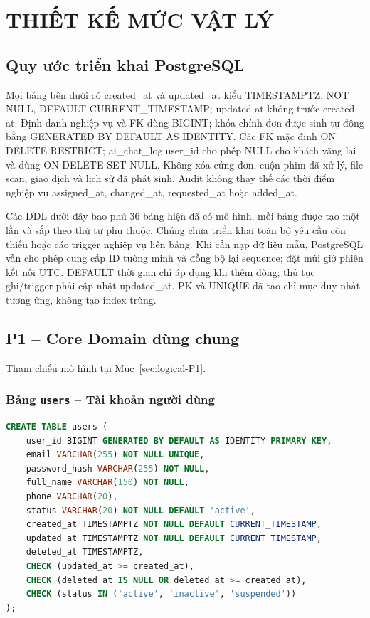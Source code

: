 \chapter{THIẾT KẾ MỨC VẬT LÝ}

\section{Quy ước triển khai PostgreSQL}

Mọi bảng bên dưới có created\_at và updated\_at kiểu TIMESTAMPTZ, NOT NULL,
DEFAULT CURRENT\_TIMESTAMP; updated at không trước created at. Định danh
nghiệp vụ và FK dùng BIGINT; khóa chính đơn được sinh tự động bằng
GENERATED BY DEFAULT AS IDENTITY. Các FK mặc định
ON DELETE RESTRICT; ai\_chat\_log.user\_id cho phép NULL cho khách vãng lai
và dùng ON DELETE SET NULL. Không xóa cứng đơn, cuộn phim đã xử lý, file
scan, giao dịch và lịch sử đã phát sinh. Audit không thay thế các thời
điểm nghiệp vụ assigned\_at, changed\_at, requested\_at hoặc added\_at.

Các DDL dưới đây bao phủ 36 bảng hiện đã có mô hình, mỗi bảng được tạo
một lần và sắp theo thứ tự phụ thuộc. Chúng chưa triển khai toàn bộ yêu
cầu còn thiếu hoặc các trigger nghiệp vụ liên bảng. Khi cần nạp dữ liệu
mẫu, PostgreSQL vẫn cho phép cung cấp ID tường minh và đồng bộ lại sequence;
đặt múi giờ phiên kết nối UTC. DEFAULT thời
gian chỉ áp dụng khi thêm dòng; thủ tục ghi/trigger phải cập nhật updated\_at.
PK và UNIQUE đã tạo chỉ mục duy nhất tương ứng, không tạo index trùng.
\section{P1 -- Core Domain dùng chung}
Tham chiếu mô hình tại Mục~\ref{sec:logical-P1}.
\subsection{Bảng \texttt{users} -- Tài khoản người dùng}
\label{physical-users}
\begin{lstlisting}[language=SQL,breaklines=true,basicstyle=\ttfamily\scriptsize]
CREATE TABLE users (
    user_id BIGINT GENERATED BY DEFAULT AS IDENTITY PRIMARY KEY,
    email VARCHAR(255) NOT NULL UNIQUE,
    password_hash VARCHAR(255) NOT NULL,
    full_name VARCHAR(150) NOT NULL,
    phone VARCHAR(20),
    status VARCHAR(20) NOT NULL DEFAULT 'active',
    created_at TIMESTAMPTZ NOT NULL DEFAULT CURRENT_TIMESTAMP,
    updated_at TIMESTAMPTZ NOT NULL DEFAULT CURRENT_TIMESTAMP,
    deleted_at TIMESTAMPTZ,
    CHECK (updated_at >= created_at),
    CHECK (deleted_at IS NULL OR deleted_at >= created_at),
    CHECK (status IN ('active', 'inactive', 'suspended'))
);
\end{lstlisting}
